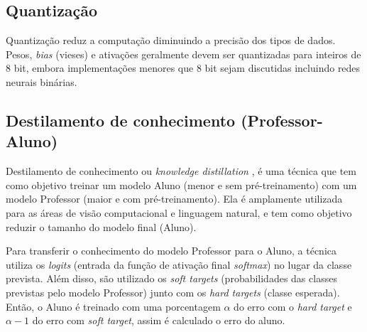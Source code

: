 \subsection{Quantização}\label{quantizacao}


Quantização reduz a computação diminuindo a precisão dos tipos de dados. Pesos, \textit{bias} (vieses) e ativações
geralmente devem ser quantizadas para inteiros de 8 bit, embora implementações menores que 8 bit sejam discutidas
incluindo redes neurais binárias. \cite{LIANG2021370}


\subsection{Destilamento de conhecimento (Professor-Aluno)}\label{conceitos_destilamento}

Destilamento de conhecimento ou \textit{knowledge distillation} \cite{hinton2015distilling}, é uma técnica que tem
como objetivo treinar um modelo Aluno (menor e sem pré-treinamento) com um modelo Professor
(maior e com pré-treinamento). Ela é amplamente utilizada para as áreas de visão computacional e linguagem natural,
e tem como objetivo reduzir o tamanho do modelo final (Aluno).

Para transferir o conhecimento do modelo Professor para o Aluno, a técnica utiliza os \textit{logits} (entrada da
função de ativação final \textit{softmax}) no lugar da classe prevista. Além disso, são utilizado os
\textit{soft targets} (probabilidades das classes previstas pelo modelo Professor) junto com os
\textit{hard targets} (classe esperada). Então, o Aluno é treinado com uma porcentagem $\alpha$ do erro com o
\textit{hard target} e $\alpha - 1$ do erro com \textit{soft target}, assim é calculado o erro do aluno.



